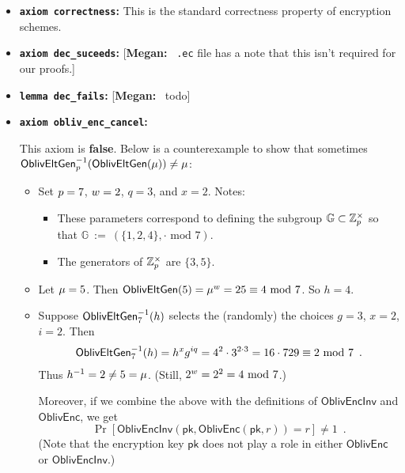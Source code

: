 \documentclass[11pt,letterpaper]{article}
\newcommand{\authnote}[2]{[{\color{red}\textbf{#1:}}~{\color{blue} #2}]}
\newcommand{\authnote}[2]{}
\newcommand{\megan}[1]{\authnote{Megan}{#1}}
\theoremstyle{plain} %
\theoremstyle{definition} %
\theoremstyle{remark} %
\newcommand{\code}[1]{\texttt{#1}} %
\newcommand{\eqdef}{\ {:=} \ }
\newcommand{\OblivEnc}{\mathsf{OblivEnc}}
\newcommand{\OblivEncInv}{\mathsf{OblivEncInv}}
\newcommand{\EncKey}{\mathsf{pk}}
\newcommand{\Rand}{r}
\newcommand{\Integers}{\mathbb{Z}}
\newcommand{\Group}{\mathbb{G}}
\newcommand{\GrpOrd}{q}
\newcommand{\GrpEltH}{h}
\newcommand{\Generator}{g}
\begin{document}
\renewcommand{\mod}{\textrm{ mod }}
\begin{itemize}
\item \textbf{\code{axiom correctness}:} This is the standard correctness property of encryption schemes.
\item \textbf{\code{axiom dec\_suceeds}:} \megan{\code{.ec} file has a note that this isn't required for our proofs.}
\item \textbf{\code{lemma dec\_fails}:} \megan{todo}
\item \textbf{\code{axiom obliv\_enc\_cancel}:}

This axiom is \textbf{false}. Below is a counterexample to show that sometimes ${\mathsf{OblivEltGen}}^{-1}_{p}(\mathsf{OblivEltGen}(\mu)) \ne \mu$:
\begin{itemize}[nolistsep]
    \item Set $p = 7$, $w = 2$, $\GrpOrd = 3$, and $x = 2$. Notes:
    \begin{itemize}[nolistsep]
        \item These parameters correspond to defining the subgroup $\Group \subset \MultGrp$ so that $\Group \eqdef (\{1,2,4\}, \cdot \mod 7)$. %
        \item The generators of $\MultGrp$ are $\{3,5\}$.
    \end{itemize}

    \item Let $\mu = 5$. Then $\OblivEltGen(5) = \RandStr^{\OrdW} = 25 \equiv 4 \mod 7$. So $\GrpEltH = 4$.
    \item Suppose $\OblivEltInv_{7}(\GrpEltH)$ selects the (randomly) the choices $\Generator=3$, $x = 2$, $i = 2$. Then
    \begin{align*}
    \OblivEltInv_{7}(\GrpEltH) = \GrpEltH^{x}\Generator^{i\GrpOrd} = 4^2 \cdot 3^{2 \cdot 3} = 16 \cdot 729 \equiv 2 \mod 7
    \enspace.
    \end{align*}
    Thus $\Inv{\GrpEltH} = 2 \ne 5 = \RandStr$. (Still, $2^{\OrdW} = 2^2 = 4 \mod 7$.)

    Moreover, if we combine the above with the definitions of $\OblivEncInv$ and $\OblivEnc$, we get
    \begin{equation*}
    \Pr\left[\OblivEncInv(\EncKey, \OblivEnc(\EncKey, \Rand)) = \Rand\right] \ne 1
    \enspace.
    \end{equation*}
    (Note that the encryption key $\EncKey$ does not play a role in either $\OblivEnc$ or $\OblivEncInv$.)
\end{itemize}


\end{itemize}
\end{document}
